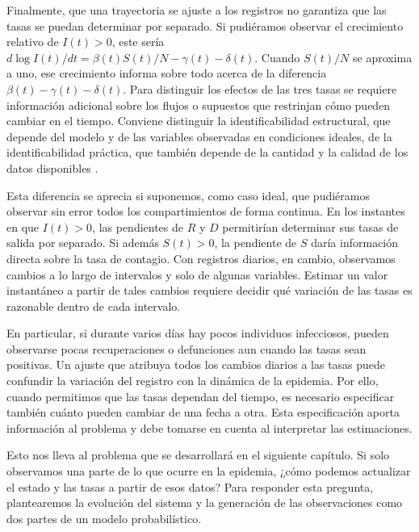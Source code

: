 Finalmente, que una trayectoria se ajuste a los registros no garantiza que las tasas se puedan determinar por separado. Si pudiéramos observar el crecimiento relativo de $I(t)>0$, este sería $d\log I(t)/dt=\beta(t)S(t)/N-\gamma(t)-\delta(t)$. Cuando $S(t)/N$ se aproxima a uno, ese crecimiento informa sobre todo acerca de la diferencia $\beta(t)-\gamma(t)-\delta(t)$. Para distinguir los efectos de las tres tasas se requiere información adicional sobre los flujos o supuestos que restrinjan cómo pueden cambiar en el tiempo. Conviene distinguir la identificabilidad estructural, que depende del modelo y de las variables observadas en condiciones ideales, de la identificabilidad práctica, que también depende de la cantidad y la calidad de los datos disponibles \cite{roosa2019}\label{cita:roosa2019}.

Esta diferencia se aprecia si suponemos, como caso ideal, que pudiéramos observar sin error todos los compartimientos de forma continua. En los instantes en que $I(t)>0$, las pendientes de $R$ y $D$ permitirían determinar sus tasas de salida por separado. Si además $S(t)>0$, la pendiente de $S$ daría información directa sobre la tasa de contagio. Con registros diarios, en cambio, observamos cambios a lo largo de intervalos y solo de algunas variables. Estimar un valor instantáneo a partir de tales cambios requiere decidir qué variación de las tasas es razonable dentro de cada intervalo.

En particular, si durante varios días hay pocos individuos infecciosos, pueden observarse pocas recuperaciones o defunciones aun cuando las tasas sean positivas. Un ajuste que atribuya todos los cambios diarios a las tasas puede confundir la variación del registro con la dinámica de la epidemia. Por ello, cuando permitimos que las tasas dependan del tiempo, es necesario especificar también cuánto pueden cambiar de una fecha a otra. Esta especificación aporta información al problema y debe tomarse en cuenta al interpretar las estimaciones.

Esto nos lleva al problema que se desarrollará en el siguiente capítulo. Si solo observamos una parte de lo que ocurre en la epidemia, ¿cómo podemos actualizar el estado y las tasas a partir de esos datos? Para responder esta pregunta, plantearemos la evolución del sistema y la generación de las observaciones como dos partes de un modelo probabilístico.




